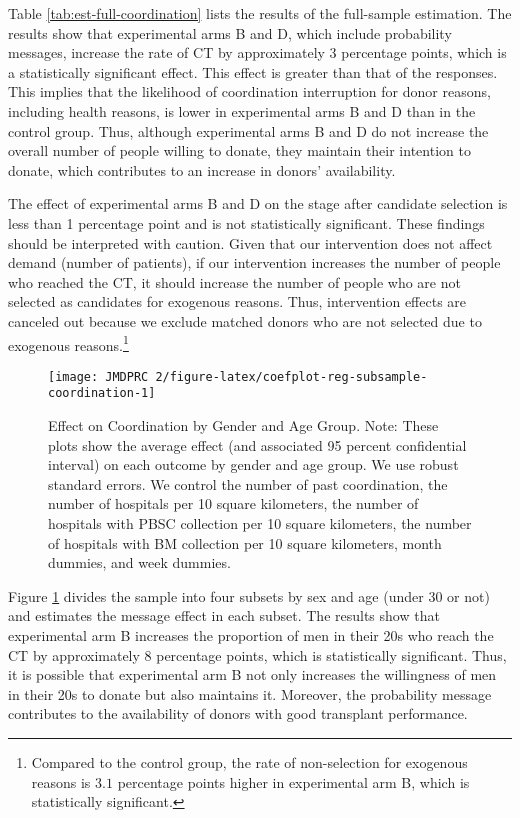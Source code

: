 \documentclass[12pt, a4paper]{article}
\begin{document}
Table \ref{tab:est-full-coordination} lists the results of the full-sample estimation. The results show that experimental arms B and D, which include probability messages, increase the rate of CT by approximately 3 percentage points, which is a statistically significant effect. This effect is greater than that of the responses. This implies that the likelihood of coordination interruption for donor reasons, including health reasons, is lower in experimental arms B and D than in the control group. Thus, although experimental arms B and D do not increase the overall number of people willing to donate, they maintain their intention to donate, which contributes to an increase in donors' availability.

The effect of experimental arms B and D on the stage after candidate selection is less than 1 percentage point and is not statistically significant. These findings should be interpreted with caution. Given that our intervention does not affect demand (number of patients), if our intervention increases the number of people who reached the CT, it should increase the number of people who are not selected as candidates for exogenous reasons. Thus, intervention effects are canceled out because we exclude matched donors who are not selected due to exogenous reasons.\footnote{Compared to the control group, the rate of non-selection for exogenous reasons is \(3.1\) percentage points higher in experimental arm B, which is statistically significant.}

\begin{figure}[t]
\texttt{[image: JMDPRC~2/figure-latex/coefplot-reg-subsample-coordination-1]} \caption{Effect on Coordination by Gender and Age Group. Note: These plots show the average effect (and associated 95 percent confidential interval) on each outcome by gender and age group. We use robust standard errors. We control the number of past coordination, the number of hospitals per 10 square kilometers, the number of hospitals with PBSC collection per 10 square kilometers, the number of hospitals with BM collection per 10 square kilometers, month dummies, and week dummies.}\label{fig:coefplot-reg-subsample-coordination}
\end{figure}

Figure \ref{fig:coefplot-reg-subsample-coordination} divides the sample into four subsets by sex and age (under 30 or not) and estimates the message effect in each subset. The results show that experimental arm B increases the proportion of men in their 20s who reach the CT by approximately 8 percentage points, which is statistically significant. Thus, it is possible that experimental arm B not only increases the willingness of men in their 20s to donate but also maintains it. Moreover, the probability message contributes to the availability of donors with good transplant performance.
\end{document}
